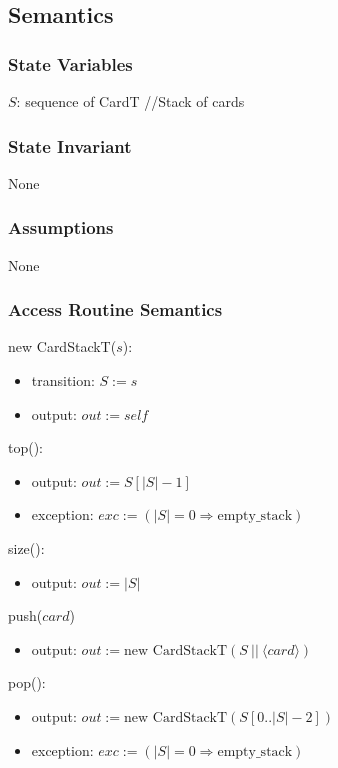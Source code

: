 \documentclass[12pt,fleqn]{article}
\begin{document}
\subsection* {Semantics}

\subsubsection* {State Variables}

$S$: sequence of CardT //Stack of cards

\subsubsection* {State Invariant}
None

\subsubsection* {Assumptions}
None

\subsubsection* {Access Routine Semantics}

\noindent new CardStackT($\mathit{s}$):
\begin{itemize}
\item transition: $S := \mathit{s}$
\item output: $out := \mathit{self}$
\end{itemize}

\noindent top():
\begin{itemize}
\item output: $out := S[|S| - 1]$
\item exception: $exc := (|S| = 0 \Rightarrow \mbox{empty\_stack})$
\end{itemize}

\noindent size():
\begin{itemize}
\item output: $out := |S|$
\end{itemize}

\noindent push($\mathit{card}$)
\begin{itemize}
\item output: $out := \mbox{new CardStackT}(S\ ||\ \langle \mathit{card} \rangle)$
\end{itemize}

\noindent pop():
\begin{itemize}
\item output: $out := \mbox{new CardStackT}(S[0..|S| - 2])$
\item exception: $exc := (|S| = 0 \Rightarrow \mbox{empty\_stack})$
\end{itemize}
\end{document}
